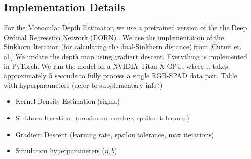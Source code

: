 \subsection{Implementation Details}
For the Monocular Depth Estimator, we use a pretrained version of the
the Deep Ordinal Regression Network (DORN) \cite{}. We use the implementation of
the Sinkhorn Iteration (for calculating the dual-Sinkhorn distance)
from \ref{Cuturi et. al.} We update the depth map using gradient descent.
Everything is implemented in PyTorch.
We run the model on a NVIDIA Titan X GPU, where it takes approximately 5 seconds
to fully process a single RGB-SPAD data pair.
Table with hyperparameters (defer to supplementary info?)
\begin{itemize}
\item Kernel Density Estimation (sigma)
\item Sinkhorn Iterations (maximum number, epsilon tolerance)
\item Gradient Descent (learning rate, epsilon tolerance, max iterations)
\item Simulation hyperparameters ($\eta, b$)
\end{itemize}



